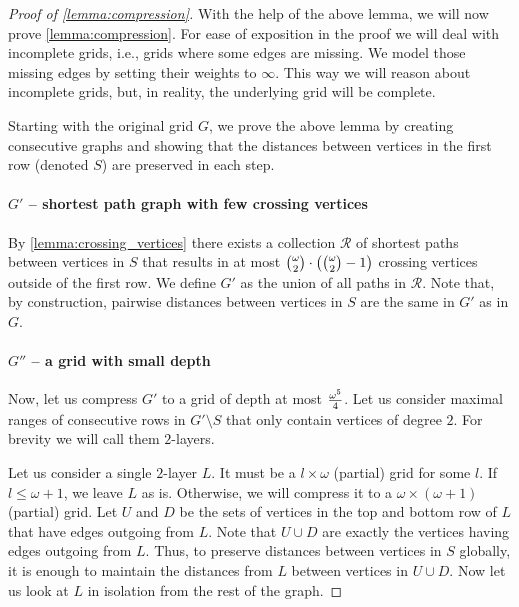    \begin{proof}[Proof of \cref{lemma:compression}]
    With the help of the above lemma, we will now prove \cref{lemma:compression}.
    For ease of exposition in the proof we will deal with incomplete grids, i.e., grids where some edges are missing.
    We model those missing edges by setting their weights to $\infty$.
    This way we will reason about incomplete grids, but, in reality, the underlying grid will be complete.

    Starting with the original grid $G$, we prove the above lemma by creating consecutive graphs
    and showing that the distances between vertices in the first row (denoted $S$) are preserved in each step.

    \paragraph{\textbf{$G'$ -- shortest path graph with few crossing vertices}}
    By \cref{lemma:crossing_vertices} there exists a collection $\mathcal{R}$ of shortest paths between vertices in $S$
    that results in at most ${\omega \choose 2} \cdot \left( {\omega \choose 2} - 1 \right)$ crossing vertices outside of the first row.
    We define $G'$ as the union of all paths in $\mathcal{R}$.
    Note that, by construction, pairwise distances between vertices in $S$ are the same in $G'$ as in $G$.

    \paragraph{\textbf{$G''$ -- a grid with small depth}}
    Now, let us compress $G'$ to a grid of depth at most $\frac{\omega^5}{4}$.
    Let us consider maximal ranges of consecutive rows in $G' \setminus S$ that only contain vertices of degree $2$.
    For brevity we will call them $2$-layers.
    
    Let us consider a single $2$-layer $L$.
    It must be a $l \times \omega$ (partial) grid for some $l$.
    If $l \leq \omega+1$, we leave $L$ as is.
    Otherwise, we will compress it to a $\omega \times (\omega+1)$ (partial) grid.
    Let $U$ and $D$ be  the sets of vertices in the top and bottom row of $L$
    that have edges outgoing from $L$.
    Note that $U \cup D$ are exactly the vertices having edges outgoing from $L$.
    Thus, to preserve distances between vertices in $S$ globally, it is enough to maintain the distances from $L$ between vertices in $U \cup D$.
    Now let us look at $L$ in isolation from the rest of the graph.
    

\end{proof}
